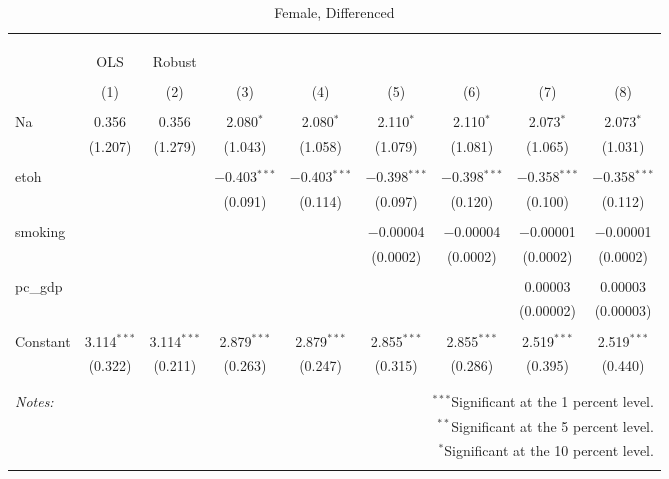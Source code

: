 \documentclass[11pt]{article}\usepackage[]{graphicx}\usepackage[]{color}
\begin{document}
\begin{table}[!htbp] \centering 
  \caption{Female, Differenced} 
  \label{} 
\begin{tabular}{@{\extracolsep{5pt}}lcccccccc} 
\\[-1.8ex]\hline 
\hline \\[-1.8ex] 
\\[-1.8ex] & \multicolumn{8}{c}{ } \\ 
 & OLS & Robust &  &  &  &  &  &  \\ 
\\[-1.8ex] & (1) & (2) & (3) & (4) & (5) & (6) & (7) & (8)\\ 
\hline \\[-1.8ex] 
 Na & 0.356 & 0.356 & 2.080$^{*}$ & 2.080$^{*}$ & 2.110$^{*}$ & 2.110$^{*}$ & 2.073$^{*}$ & 2.073$^{*}$ \\ 
  & (1.207) & (1.279) & (1.043) & (1.058) & (1.079) & (1.081) & (1.065) & (1.031) \\ 
  & & & & & & & & \\ 
 etoh &  &  & $-$0.403$^{***}$ & $-$0.403$^{***}$ & $-$0.398$^{***}$ & $-$0.398$^{***}$ & $-$0.358$^{***}$ & $-$0.358$^{***}$ \\ 
  &  &  & (0.091) & (0.114) & (0.097) & (0.120) & (0.100) & (0.112) \\ 
  & & & & & & & & \\ 
 smoking &  &  &  &  & $-$0.00004 & $-$0.00004 & $-$0.00001 & $-$0.00001 \\ 
  &  &  &  &  & (0.0002) & (0.0002) & (0.0002) & (0.0002) \\ 
  & & & & & & & & \\ 
 pc\_gdp &  &  &  &  &  &  & 0.00003 & 0.00003 \\ 
  &  &  &  &  &  &  & (0.00002) & (0.00003) \\ 
  & & & & & & & & \\ 
 Constant & 3.114$^{***}$ & 3.114$^{***}$ & 2.879$^{***}$ & 2.879$^{***}$ & 2.855$^{***}$ & 2.855$^{***}$ & 2.519$^{***}$ & 2.519$^{***}$ \\ 
  & (0.322) & (0.211) & (0.263) & (0.247) & (0.315) & (0.286) & (0.395) & (0.440) \\ 
  & & & & & & & & \\ 
\hline 
\hline \\[-1.8ex] 
\textit{Notes:} & \multicolumn{8}{r}{$^{***}$Significant at the 1 percent level.} \\ 
 & \multicolumn{8}{r}{$^{**}$Significant at the 5 percent level.} \\ 
 & \multicolumn{8}{r}{$^{*}$Significant at the 10 percent level.} \\ 
 & \multicolumn{8}{r}{} \\ 
\end{tabular} 
\end{table} 
\end{document}
